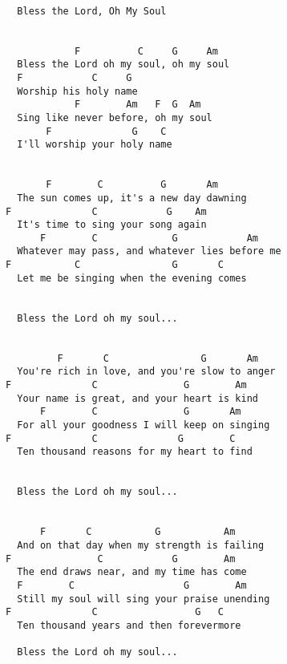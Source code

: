 \documentclass[10pt,oneside,footinclude=true,headinclude=true]{scrbook} %
\begin{document}
\begin{verbatim}

  Bless the Lord, Oh My Soul
  
 
            F          C     G     Am
  Bless the Lord oh my soul, oh my soul
  F            C     G
  Worship his holy name
            F        Am   F  G  Am
  Sing like never before, oh my soul
       F              G    C
  I'll worship your holy name
  

       F        C          G       Am
  The sun comes up, it's a new day dawning
F              C            G    Am
  It's time to sing your song again
      F        C             G            Am
  Whatever may pass, and whatever lies before me
F           C                G       C
  Let me be singing when the evening comes
  

  Bless the Lord oh my soul...

  
         F       C                G       Am
  You're rich in love, and you're slow to anger
F              C               G        Am
  Your name is great, and your heart is kind
      F        C               G       Am
  For all your goodness I will keep on singing
F              C              G        C
  Ten thousand reasons for my heart to find
  

  Bless the Lord oh my soul...
  

      F       C           G           Am
  And on that day when my strength is failing
F               C            G        Am
  The end draws near, and my time has come
  F        C                   G        Am
  Still my soul will sing your praise unending
F              C                 G   C
  Ten thousand years and then forevermore
  
  Bless the Lord oh my soul...
\end{verbatim}
\newpage
\bigskip  
\end{document}

